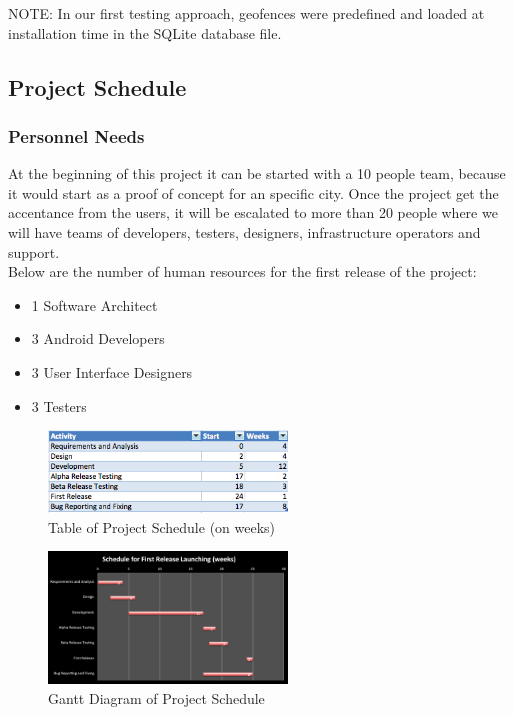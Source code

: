 NOTE: In our first testing approach, geofences were predefined and loaded at installation time in the SQLite 
database file.

\subsection{Project Schedule}

\subsubsection{Personnel Needs}
At the beginning of this project it can be started with a 10 people team, because it 
would start as a proof of concept for an specific city. Once the project get the 
accentance from the users, it will be escalated to more than 20 people where we will
have teams of developers, testers, designers, infrastructure operators and support.\\

Below are the number of human resources for the first release of the project:

\begin{itemize}
  \item 1 Software Architect
  \item 3 Android Developers
  \item 3 User Interface Designers
  \item 3 Testers 
\end{itemize}

\begin{figure}[ht]
  \centering
  \includegraphics[width=2.5in]{schedule_table}
  \caption{Table of Project Schedule (on weeks)}
  \label{fig2}
\end{figure}


\begin{figure}[ht]
  \centering
  \includegraphics[width=2.5in]{schedule_gantt}
  \caption{Gantt Diagram of Project Schedule}
  \label{fig3}
\end{figure}

